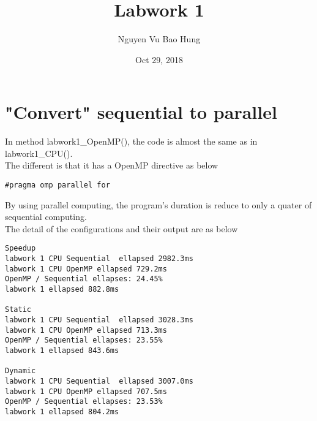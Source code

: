 \documentclass{article}
\title{Labwork 1}
\author{Nguyen Vu Bao Hung}
\date{Oct 29, 2018}
\begin{document}
\maketitle

\section{"Convert" sequential to parallel }
In method labwork1\_OpenMP(), the code is almost the same as in labwork1\_CPU().\\
The different is that it has a OpenMP directive as below
\begin{verbatim}
#pragma omp parallel for
\end{verbatim}

By using parallel computing, the program's duration is reduce to only a quater of sequential computing.\\
The detail of the configurations and their output are as below

\begin{verbatim}
Speedup
labwork 1 CPU Sequential  ellapsed 2982.3ms
labwork 1 CPU OpenMP ellapsed 729.2ms
OpenMP / Sequential ellapses: 24.45% 
labwork 1 ellapsed 882.8ms

Static
labwork 1 CPU Sequential  ellapsed 3028.3ms
labwork 1 CPU OpenMP ellapsed 713.3ms
OpenMP / Sequential ellapses: 23.55% 
labwork 1 ellapsed 843.6ms

Dynamic
labwork 1 CPU Sequential  ellapsed 3007.0ms
labwork 1 CPU OpenMP ellapsed 707.5ms
OpenMP / Sequential ellapses: 23.53% 
labwork 1 ellapsed 804.2ms
\end{verbatim}
\end{document}
